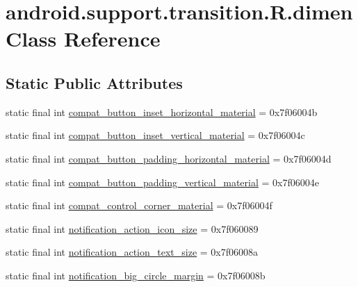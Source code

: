 \hypertarget{classandroid_1_1support_1_1transition_1_1_r_1_1dimen}{}\section{android.\+support.\+transition.\+R.\+dimen Class Reference}
\label{classandroid_1_1support_1_1transition_1_1_r_1_1dimen}
\subsection*{Static Public Attributes}
\begin{DoxyCompactItemize}
\item 
static final int \mbox{\hyperlink{classandroid_1_1support_1_1transition_1_1_r_1_1dimen_ad48c30c57f147b3c4862710beca8e4da}{compat\+\_\+button\+\_\+inset\+\_\+horizontal\+\_\+material}} = 0x7f06004b
\item 
static final int \mbox{\hyperlink{classandroid_1_1support_1_1transition_1_1_r_1_1dimen_a6df64291afb714b8eef79ccb2d3d903a}{compat\+\_\+button\+\_\+inset\+\_\+vertical\+\_\+material}} = 0x7f06004c
\item 
static final int \mbox{\hyperlink{classandroid_1_1support_1_1transition_1_1_r_1_1dimen_ac3103c3e23c6252fdf914a61c1bbb9a2}{compat\+\_\+button\+\_\+padding\+\_\+horizontal\+\_\+material}} = 0x7f06004d
\item 
static final int \mbox{\hyperlink{classandroid_1_1support_1_1transition_1_1_r_1_1dimen_a88db3cd5630edb0d3f334347d36e9eca}{compat\+\_\+button\+\_\+padding\+\_\+vertical\+\_\+material}} = 0x7f06004e
\item 
static final int \mbox{\hyperlink{classandroid_1_1support_1_1transition_1_1_r_1_1dimen_aa31fe95e8483316ad69395c3e5e15ed2}{compat\+\_\+control\+\_\+corner\+\_\+material}} = 0x7f06004f
\item 
static final int \mbox{\hyperlink{classandroid_1_1support_1_1transition_1_1_r_1_1dimen_aa2af3d20712209a6784f24bb01652ee9}{notification\+\_\+action\+\_\+icon\+\_\+size}} = 0x7f060089
\item 
static final int \mbox{\hyperlink{classandroid_1_1support_1_1transition_1_1_r_1_1dimen_aeea4229b64aeb5cafa0efaeb8a75ee88}{notification\+\_\+action\+\_\+text\+\_\+size}} = 0x7f06008a
\item 
static final int \mbox{\hyperlink{classandroid_1_1support_1_1transition_1_1_r_1_1dimen_a680b4f6c05c80a1a09472747a9d11a34}{notification\+\_\+big\+\_\+circle\+\_\+margin}} = 0x7f06008b
\item 

\end{DoxyCompactItemize}
